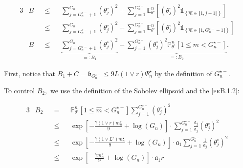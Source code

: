 \begin{alignat*}{3}
& B && \leq && \sum\limits_{j = G_{n}^{\star-} + 1}^{G_{n}} \left(\theta^{\circ}_{j}\right)^{2} + \sum\limits_{j = 1}^{G_{n}^{\star-}} \mathds{E}_{\theta^{\circ}}^{n}\left[\left(\theta^{\circ}_{j}\right)^{2} \mathds{1}_{\left\{\widehat{m} \in \llbracket 1, j - 1 \rrbracket\right\}}\right]\\
& && \leq && \sum\limits_{j = G_{n}^{\star-} + 1}^{G_{n}} \left(\theta^{\circ}_{j}\right)^{2} + \sum\limits_{j = 1}^{G_{n}^{\star-}} \mathds{E}_{\theta^{\circ}}^{n}\left[\left(\theta^{\circ}_{j}\right)^{2} \mathds{1}_{\left\{\widehat{m} \in \llbracket 1, G_{n}^{\star-} - 1 \rrbracket\right\}}\right]\\
& B && \leq && \underbrace{\sum\limits_{j = G_{n}^{\star-} + 1}^{G_{n}} \left(\theta^{\circ}_{j}\right)^{2}}_{=: B_{1}} + \underbrace{\sum\limits_{j = 1}^{G_{n}^{\star-}} \left(\theta^{\circ}_{j}\right)^{2} \mathds{P}_{\theta^{\circ}}^{n}\left[1 \leq \widehat{m} < G_{n}^{\star-}\right]}_{=: B_{2}}.
\end{alignat*}

\medskip

First, notice that $B_{1} + C = \mathfrak{b}_{G_{n}^{\star-}} \leq 9 L \left(1 \vee r\right) \Psi_{n}^{\star}$ by the definition of $G_{n}^{\star-}.$

\medskip

To control $B_{2},$ we use the definition of the Sobolev ellipsoid and the \textsc{\cref{prB.1.2}}:
 
\begin{alignat*}{3}
& B_{2} && = && \mathds{P}_{\theta^{\circ}}^{n}\left[1 \leq \widehat{m} < G_{n}^{\star-}\right] \sum\limits_{j = 1}^{G_{n}^{\star-}} \left(\theta^{\circ}_{j}\right)^{2} \\
& && \leq && \exp\left[-\frac{7 \left(1 \vee r\right) m_{n}^{\star}}{9} + \log\left(G_{n}\right)\right] \cdot \sum\limits_{j = 1}^{G_{n}^{\star-}} \frac{\mathfrak{a}_{j}}{\mathfrak{a}_{j}}\left(\theta^{\circ}_{j}\right)^{2}\\
& && \leq && \exp\left[-\frac{7 \left(1 \vee L^{\circ} \right) m_{n}^{\star}}{9} + \log\left(G_{n}\right)\right] \cdot \mathfrak{a}_{1}\sum\limits_{j = 1}^{G_{n}^{\star-}} \frac{1}{\mathfrak{a}_{j}}\left(\theta^{\circ}_{j}\right)^{2}\\
& && \leq && \exp\left[-\frac{7 m_{n}^{\star}}{9} + \log\left(G_{n}\right)\right] \cdot \mathfrak{a}_{1}r\\
 \end{alignat*}


